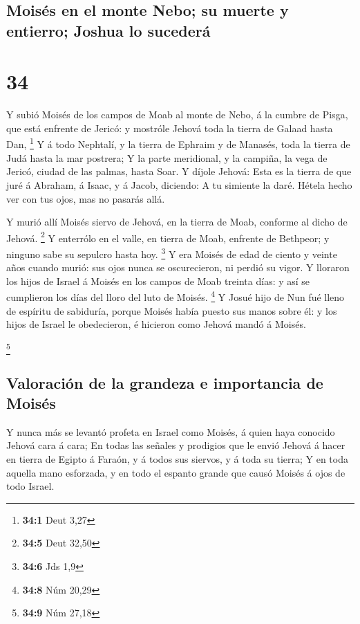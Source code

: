 \hypertarget{moisuxe9s-en-el-monte-nebo-su-muerte-y-entierro-joshua-lo-sucederuxe1}{%
\subsection{Moisés en el monte Nebo; su muerte y entierro; Joshua lo
sucederá}\label{moisuxe9s-en-el-monte-nebo-su-muerte-y-entierro-joshua-lo-sucederuxe1}}

\hypertarget{section-33}{%
\section{34}\label{section-33}}

 Y subió Moisés de los campos de Moab al monte de Nebo, á la
cumbre de Pisga, que está enfrente de Jericó: y mostróle Jehová toda la
tierra de Galaad hasta Dan, \footnote{\textbf{34:1} Deut 3,27}
 Y á todo Nephtalí, y la tierra de Ephraim y de Manasés,
toda la tierra de Judá hasta la mar postrera;  Y la parte
meridional, y la campiña, la vega de Jericó, ciudad de las palmas, hasta
Soar.  Y díjole Jehová: Esta es la tierra de que juré á
Abraham, á Isaac, y á Jacob, diciendo: A tu simiente la daré. Hétela
hecho ver con tus ojos, mas no pasarás allá.

 Y murió allí Moisés siervo de Jehová, en la tierra de Moab,
conforme al dicho de Jehová. \footnote{\textbf{34:5} Deut 32,50}
 Y enterrólo en el valle, en tierra de Moab, enfrente de
Bethpeor; y ninguno sabe su sepulcro hasta hoy. \footnote{\textbf{34:6}
  Jds 1,9}  Y era Moisés de edad de ciento y veinte años
cuando murió: sus ojos nunca se oscurecieron, ni perdió su vigor.
 Y lloraron los hijos de Israel á Moisés en los campos de
Moab treinta días: y así se cumplieron los días del lloro del luto de
Moisés. \footnote{\textbf{34:8} Núm 20,29}  Y Josué hijo de
Nun fué lleno de espíritu de sabiduría, porque Moisés había puesto sus
manos sobre él: y los hijos de Israel le obedecieron, é hicieron como
Jehová mandó á Moisés.

\footnote{\textbf{34:9} Núm 27,18}

\hypertarget{valoraciuxf3n-de-la-grandeza-e-importancia-de-moisuxe9s}{%
\subsection{Valoración de la grandeza e importancia de
Moisés}\label{valoraciuxf3n-de-la-grandeza-e-importancia-de-moisuxe9s}}

 Y nunca más se levantó profeta en Israel como Moisés, á
quien haya conocido Jehová cara á cara;  En todas las
señales y prodigios que le envió Jehová á hacer en tierra de Egipto á
Faraón, y á todos sus siervos, y á toda su tierra;  Y en
toda aquella mano esforzada, y en todo el espanto grande que causó
Moisés á ojos de todo Israel.
